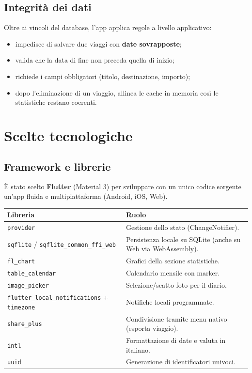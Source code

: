 \documentclass[11pt, a4paper]{article}
\begin{document}
\subsection{Integrità dei dati}
Oltre ai vincoli del database, l'app applica regole a livello applicativo:
\begin{itemize}[noitemsep]
    \item impedisce di salvare due viaggi con \textbf{date sovrapposte};
    \item valida che la data di fine non preceda quella di inizio;
    \item richiede i campi obbligatori (titolo, destinazione, importo);
    \item dopo l'eliminazione di un viaggio, allinea le cache in memoria così le
    statistiche restano coerenti.
\end{itemize}

\section{Scelte tecnologiche}

\subsection{Framework e librerie}
È stato scelto \textbf{Flutter} (Material 3) per sviluppare con un unico codice
sorgente un'app fluida e multipiattaforma (Android, iOS, Web).

\begin{table}[h!]
    \centering
    \renewcommand{\arraystretch}{1.3}
    \begin{tabularx}{\textwidth}{l X}
        \toprule
        \textbf{Libreria} & \textbf{Ruolo} \\
        \midrule
        \texttt{provider} & Gestione dello stato (ChangeNotifier). \\
        \texttt{sqflite} / \texttt{sqflite\_common\_ffi\_web} & Persistenza locale su SQLite (anche su Web via WebAssembly). \\
        \texttt{fl\_chart} & Grafici della sezione statistiche. \\
        \texttt{table\_calendar} & Calendario mensile con marker. \\
        \texttt{image\_picker} & Selezione/scatto foto per il diario. \\
        \texttt{flutter\_local\_notifications} + \texttt{timezone} & Notifiche locali programmate. \\
        \texttt{share\_plus} & Condivisione tramite menu nativo (esporta viaggio). \\
        \texttt{intl} & Formattazione di date e valuta in italiano. \\
        \texttt{uuid} & Generazione di identificatori univoci. \\
        \bottomrule
    \end{tabularx}
\end{table}
\end{document}
